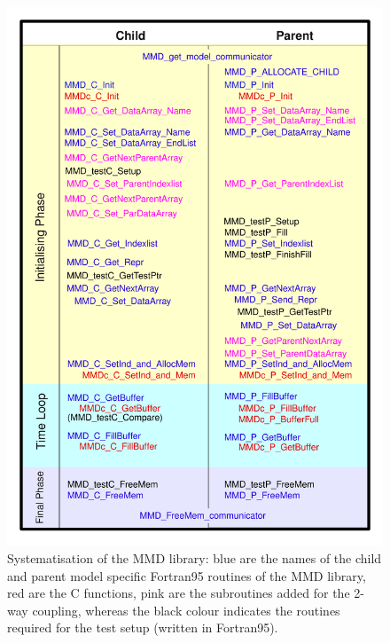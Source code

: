 \documentclass[twoside]{article}
\begin{document}
\begin{figure}
\begin{center} 
\includegraphics[height=0.86\textheight]{MMDlib_work_flow.pdf} 
\end{center} 
\caption{Systematisation of the MMD library: blue are the names of the
 child and parent model specific Fortran95 routines of the MMD
 library, red are the C functions, 
pink are the subroutines added for the 2-way coupling, whereas the
black colour indicates the routines required for the test setup  
(written in Fortran95).} 
\label{fig:MMD-workflow} 
\end{figure} 
\end{document}

